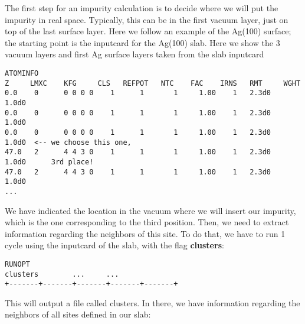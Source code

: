 \documentclass[a4paper,10pt,fullpage]{report}
\begin{document}
The first step for an impurity calculation is to decide where we will put the 
impurity in real space. Typically, this can be in the first vacuum layer,
just on top of the last surface layer. Here we follow an example 
of the Ag(100) surface; the starting point is the 
inputcard for the Ag(100) slab. 
Here we show the 3 vacuum layers and first
Ag surface layers taken from the slab inputcard
\begin{verbatim}
ATOMINFO
Z     LMXC    KFG     CLS   REFPOT   NTC    FAC    IRNS   RMT     WGHT
0.0    0      0 0 0 0    1      1       1     1.00    1   2.3d0   1.0d0
0.0    0      0 0 0 0    1      1       1     1.00    1   2.3d0   1.0d0
0.0    0      0 0 0 0    1      1       1     1.00    1   2.3d0   1.0d0  <-- we choose this one,
47.0   2      4 4 3 0    1      1       1     1.00    1   2.3d0   1.0d0      3rd place!
47.0   2      4 4 3 0    1      1       1     1.00    1   2.3d0   1.0d0
...
\end{verbatim}
We have indicated the location in the vacuum where we will insert our impurity,
which is the one corresponding to the third position. 
Then, we need to extract information regarding the neighbors of this site. 
To do that, we have to run 1 cycle using the inputcard of the slab,
with the flag \textbf{clusters}:
\begin{verbatim}
RUNOPT
clusters        ...     ...
+-------+-------+-------+-------+-------+
\end{verbatim}
This will output a file called clusters. In there, we have information
regarding the neighbors of all sites defined in our slab:
\end{document}

